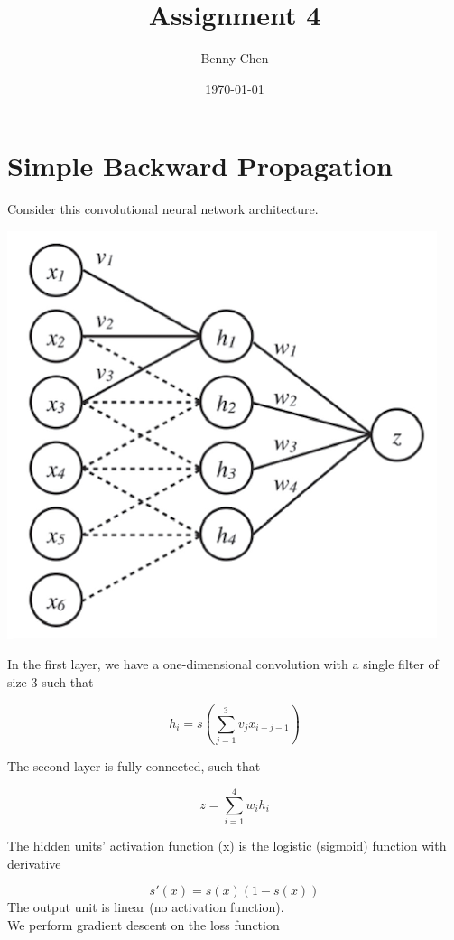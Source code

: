 \documentclass{article}
\title{Assignment 4}
\author{Benny Chen}
\date{\today}
\begin{document}
\maketitle

\section{Simple Backward Propagation}

Consider this convolutional neural network architecture.

\begin{center}
    \includegraphics[scale=0.5]{images/Q1P1.png}
\end{center}

In the first layer, we have a one-dimensional convolution with a single filter of size 3 such that

\begin{equation}
    h_i = s(\sum_{j=1}^{3} v_j x_{i+j-1})
\end{equation}

The second layer is fully connected, such that

\begin{equation}
    z = \sum_{i=1}^{4} w_i h_i
\end{equation}

The hidden units' activation function (x) is the logistic (sigmoid) function with derivative

\begin{equation}
    s'(x) = s(x)(1-s(x))
\end{equation}
The output unit is linear (no activation function).
\\
We perform gradient descent on the loss function
\end{document}
